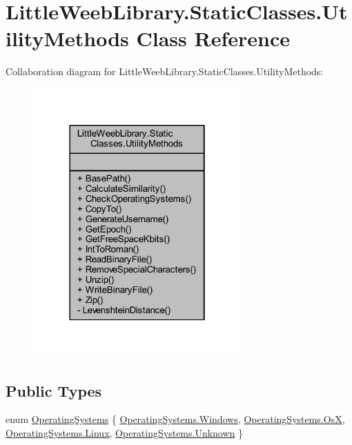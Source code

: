 \hypertarget{class_little_weeb_library_1_1_static_classes_1_1_utility_methods}{}\section{Little\+Weeb\+Library.\+Static\+Classes.\+Utility\+Methods Class Reference}
\label{class_little_weeb_library_1_1_static_classes_1_1_utility_methods}


Collaboration diagram for Little\+Weeb\+Library.\+Static\+Classes.\+Utility\+Methods\+:\nopagebreak
\begin{figure}[H]
\begin{center}
\leavevmode
\includegraphics[width=226pt]{class_little_weeb_library_1_1_static_classes_1_1_utility_methods__coll__graph}
\end{center}
\end{figure}
\subsection*{Public Types}
\begin{DoxyCompactItemize}
\item 
enum \mbox{\hyperlink{class_little_weeb_library_1_1_static_classes_1_1_utility_methods_aad4a2807f22b8cb65b8db3cdc981a0b1}{Operating\+Systems}} \{ \mbox{\hyperlink{class_little_weeb_library_1_1_static_classes_1_1_utility_methods_aad4a2807f22b8cb65b8db3cdc981a0b1aaea23489ce3aa9b6406ebb28e0cda430}{Operating\+Systems.\+Windows}}, 
\mbox{\hyperlink{class_little_weeb_library_1_1_static_classes_1_1_utility_methods_aad4a2807f22b8cb65b8db3cdc981a0b1af0db3bf534c8f5fb180a104e63d8088c}{Operating\+Systems.\+OsX}}, 
\mbox{\hyperlink{class_little_weeb_library_1_1_static_classes_1_1_utility_methods_aad4a2807f22b8cb65b8db3cdc981a0b1aedc9f0a5a5d57797bf68e37364743831}{Operating\+Systems.\+Linux}}, 
\mbox{\hyperlink{class_little_weeb_library_1_1_static_classes_1_1_utility_methods_aad4a2807f22b8cb65b8db3cdc981a0b1a88183b946cc5f0e8c96b2e66e1c74a7e}{Operating\+Systems.\+Unknown}}
 \}
\end{DoxyCompactItemize}
